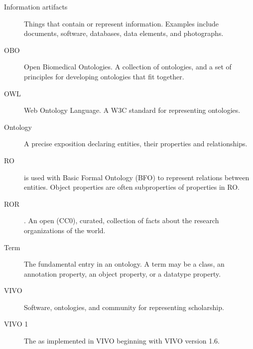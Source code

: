 \documentclass[letterpaper,10pt,english]{sphinxmanual}
\begin{document}
\begin{description}
\item[{Information artifacts\label{\detokenize{glossary:term-Information-artifacts}}}] \leavevmode
\sphinxAtStartPar
Things that contain or represent information.  Examples include documents, software,
databases, data elements, and photographs.

\item[{OBO\label{\detokenize{glossary:term-OBO}}}] \leavevmode
\sphinxAtStartPar
Open Biomedical Ontologies.  A collection of ontologies, and a set of principles
for developing ontologies that fit together.

\item[{OWL\label{\detokenize{glossary:term-OWL}}}] \leavevmode
\sphinxAtStartPar
Web Ontology Language.  A W3C standard for representing ontologies.

\item[{Ontology\label{\detokenize{glossary:term-Ontology}}}] \leavevmode
\sphinxAtStartPar
A precise exposition declaring entities, their properties and relationships.

\item[{RO\label{\detokenize{glossary:term-RO}}}] \leavevmode
\sphinxAtStartPar
{} is used with Basic Formal Ontology (BFO)
to represent relations between entities.  Object properties are often sub\sphinxhyphen{}properties
of properties in RO.

\item[{ROR\label{\detokenize{glossary:term-ROR}}}] \leavevmode
\sphinxAtStartPar
{}.  An open (CC0), curated,
collection of facts about the
research organizations of the world.

\item[{Term\label{\detokenize{glossary:term-Term}}}] \leavevmode
\sphinxAtStartPar
The fundamental entry in an ontology. A term may be a class, an annotation property,
an object property, or a datatype property.

\item[{VIVO\label{\detokenize{glossary:term-VIVO}}}] \leavevmode
\sphinxAtStartPar
Software, ontologies, and community for representing scholarship.

\item[{VIVO 1\label{\detokenize{glossary:term-VIVO-1}}}] \leavevmode
\sphinxAtStartPar
The  as
implemented in VIVO beginning with VIVO version 1.6.

\end{description}
\end{document}
